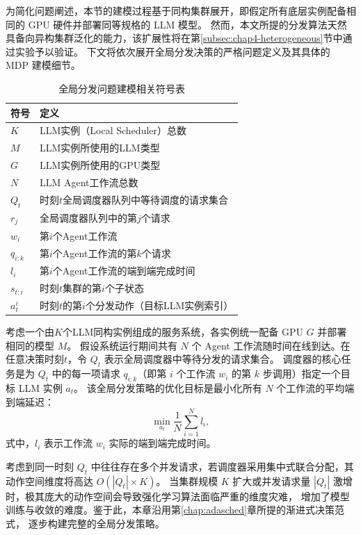 为简化问题阐述，本节的建模过程基于同构集群展开，即假定所有底层实例配备相同的 GPU 硬件并部署同等规格的 LLM 模型。
然而，本文所提的分发算法天然具备向异构集群泛化的能力，该扩展性将在第\ref{subsec:chap4-heterogeneous}节中通过实验予以验证。
下文将依次展开全局分发决策的严格问题定义及其具体的 MDP 建模细节。

\begin{table}[htbp]
  \centering
  \caption{全局分发问题建模相关符号表}
  \begin{tabular}{ll}
    \toprule
    符号        & 定义                         \\
    \midrule
    $K$       & LLM实例（Local Scheduler）总数   \\
    $M$       & LLM实例所使用的LLM类型             \\
    $G$       & LLM实例所使用的GPU类型             \\
    $N$       & LLM Agent工作流总数             \\
    $Q_t$     & 时刻$t$全局调度器队列中等待调度的请求集合     \\
    $r_j$     & 全局调度器队列中的第$j$个请求      \\
    $w_i$     & 第$i$个Agent工作流              \\
    $q_{i:k}$ & 第$i$个Agent工作流的第$k$个请求      \\
    $l_i$     & 第$i$个Agent工作流的端到端完成时间         \\
    $s_{t:i}$ & 时刻$t$集群的第$i$个子状态     \\
    $a_t^i$   & 时刻$t$的第$i$个分发动作（目标LLM实例索引） \\
    \bottomrule
  \end{tabular}
  \label{tab:chapter4-symbols}
\end{table}

考虑一个由$K$个LLM同构实例组成的服务系统，各实例统一配备 GPU $G$ 并部署相同的模型 $M$。
假设系统运行期间共有 $N$ 个 Agent 工作流随时间在线到达。在任意决策时刻$t$，令 $Q_t$ 表示全局调度器中等待分发的请求集合。
调度器的核心任务是为 $Q_t$ 中的每一项请求 $q_{i:k}$（即第 $i$ 个工作流 $w_i$ 的第 $k$ 步调用）指定一个目标 LLM 实例 $a_t$。
该全局分发策略的优化目标是最小化所有 $N$ 个工作流的平均端到端延迟：
\begin{equation}
  \min_{a_t} \frac{1}{N}\sum_{i=1}^{N} l_i,
\end{equation}
\noindent 式中，$l_i$ 表示工作流 $w_i$ 实际的端到端完成时间。

考虑到同一时刻 $Q_t$ 中往往存在多个并发请求，若调度器采用集中式联合分配，其动作空间维度将高达 $O\left(\left|Q_t\right| \times K\right)$。
当集群规模 $K$ 扩大或并发请求量 $\left|Q_t\right|$ 激增时，极其庞大的动作空间会导致强化学习算法面临严重的维度灾难，
增加了模型训练与收敛的难度。鉴于此，本章沿用第\ref{chap:adasched}章所提的渐进式决策范式，
逐步构建完整的全局分发策略。

